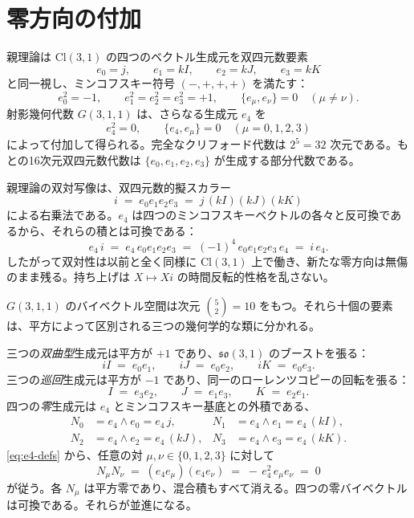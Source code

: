 \documentclass[a4paper]{article}
\begin{document}
\section{零方向の付加}
\label{sec:adjunction}

親理論は \(\mathrm{Cl}(3,1)\) の四つのベクトル生成元を双四元数要素
\[
e_{0}=j,\qquad e_{1}=kI,\qquad e_{2}=kJ,\qquad e_{3}=kK
\]
と同一視し、ミンコフスキー符号 \((-,+,+,+)\) を満たす：
\[
e_{0}^{2}=-1,\qquad e_{1}^{2}=e_{2}^{2}=e_{3}^{2}=+1,\qquad \{e_{\mu},e_{\nu}\}=0\quad(\mu\neq\nu).
\]
射影幾何代数 \(G(3,1,1)\) は、さらなる生成元 \(e_{4}\) を
\begin{equation}
e_{4}^{2}=0,\qquad \{e_{4},e_{\mu}\}=0\quad(\mu=0,1,2,3)
\label{eq:e4-defs}
\end{equation}
によって付加して得られる。完全なクリフォード代数は \(2^{5}=32\) 次元である。もとの16次元双四元数代数は \(\{e_{0},e_{1},e_{2},e_{3}\}\) が生成する部分代数である。

親理論の双対写像は、双四元数的擬スカラー~\cite{ConwaySmith2003}
\[
i \;=\; e_{0}e_{1}e_{2}e_{3} \;=\; j\,(kI)(kJ)(kK)
\]
による右乗法である。\(e_{4}\) は四つのミンコフスキーベクトルの各々と反可換であるから、それらの積とは可換である：
\[
e_{4}\,i \;=\; e_{4}\,e_{0}e_{1}e_{2}e_{3} \;=\; (-1)^{4}\,e_{0}e_{1}e_{2}e_{3}\,e_{4} \;=\; i\,e_{4}.
\]
したがって双対性は以前と全く同様に \(\mathrm{Cl}(3,1)\) 上で働き、新たな零方向は無傷のまま残る。持ち上げは \(X\mapsto Xi\) の時間反転的性格を乱さない。

\(G(3,1,1)\) のバイベクトル空間は次元 \(\binom{5}{2}=10\) をもつ。それら十個の要素は、平方によって区別される三つの幾何学的な類に分かれる。

三つの\emph{双曲型}生成元は平方が \(+1\) であり、\(\mathfrak{so}(3,1)\) のブーストを張る：
\[
iI \;=\; e_{0}e_{1},\qquad iJ \;=\; e_{0}e_{2},\qquad iK \;=\; e_{0}e_{3}.
\]
三つの\emph{巡回}生成元は平方が \(-1\) であり、同一のローレンツコピーの回転を張る：
\[
I \;=\; e_{3}e_{2},\qquad J \;=\; e_{1}e_{3},\qquad K \;=\; e_{2}e_{1}.
\]
四つの\emph{零}生成元は \(e_{4}\) とミンコフスキー基底との外積である、
\begin{align*}
N_{0} &= e_{4}\wedge e_{0} = e_{4}\,j, &
N_{1} &= e_{4}\wedge e_{1} = e_{4}\,(kI),\\
N_{2} &= e_{4}\wedge e_{2} = e_{4}\,(kJ), &
N_{3} &= e_{4}\wedge e_{3} = e_{4}\,(kK).
\end{align*}
\eqref{eq:e4-defs} から、任意の対 \(\mu,\nu\in\{0,1,2,3\}\) に対して
\begin{equation}
N_{\mu}N_{\nu} \;=\; (e_{4}e_{\mu})(e_{4}e_{\nu}) \;=\; -\,e_{4}^{2}\,e_{\mu}e_{\nu} \;=\; 0
\label{eq:null-strong-vanishing}
\end{equation}
が従う。各 \(N_{\mu}\) は平方零であり、混合積もすべて消える。四つの零バイベクトルは可換である。それらが並進になる。
\end{document}
